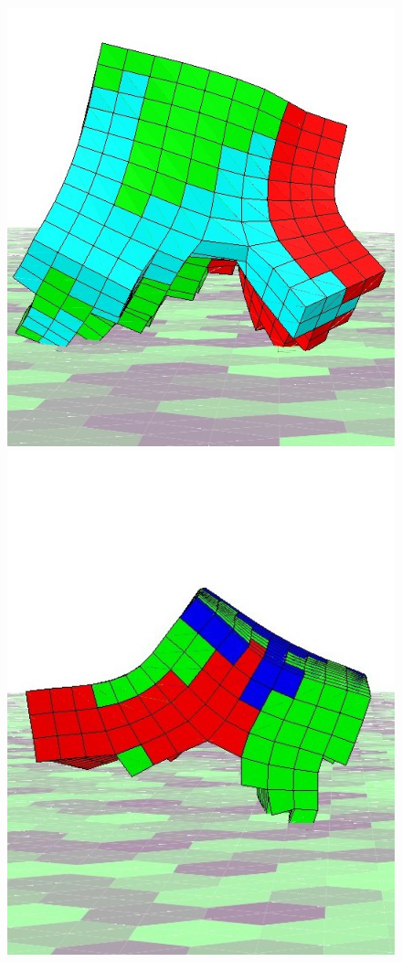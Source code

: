 \begin{figure}[t!]
\centering
\includegraphics[height=0.2\textheight]{../Figures/Robots/nov-4-6.jpg}
\includegraphics[height=0.2\textheight]{../Figures/Robots/nov-2-6.jpg}

\end{figure}
